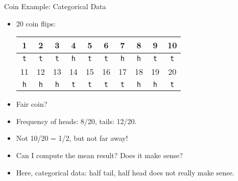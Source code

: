 \documentclass[9pt]{beamer}
\newcommand{\tT}{\texttt{t}}
\newcommand{\tH}{\texttt{h}}
\begin{document}
\begin{frame}{Coin Example: Categorical Data}
  \begin{itemize}
  \item 20 coin flips:
    \begin{center}
    {\small
      \begin{tabular}[h]{|c|c|c|c|c|c|c|c|c|c|}\hline
        1 &   2 &   3 &  4  &   5 &   6 &   7 &   8 &   9 &  10 \\\hline
        \tT & \tT & \tT & \tH & \tT & \tT & \tH & \tH & \tT & \tT \\\hline
        11 &  12 &  13 &  14 &  15 &  16 &  17 &  18 &  19 &  20 \\\hline
        \tH & \tH & \tH & \tT & \tT & \tT & \tT & \tH & \tH & \tT\\\hline
      \end{tabular}
    }    
    \end{center}
  \item Fair coin?
  \item Frequency of heads: 8/20, tails: 12/20.
  \item Not 10/20 = 1/2, but not far away!
  \item Can I compute the mean result? Does it make sense?
  \item Here, categorical data: half tail, half head does not really make sense.
  \end{itemize}
\end{frame}
\end{document}
